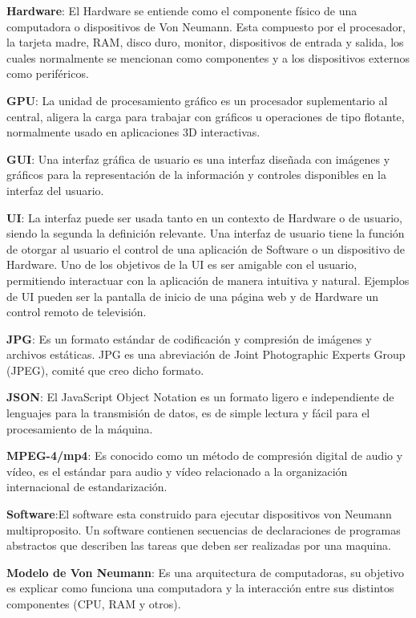 \textbf{Hardware}: El Hardware se entiende como el componente físico de una computadora o dispositivos de Von Neumann. Esta compuesto por el procesador, la tarjeta madre, RAM, disco duro, monitor, dispositivos de entrada y salida, los cuales normalmente se mencionan como componentes y a los dispositivos externos como periféricos\cite{hardwaredef}.

\textbf{GPU}: La unidad de procesamiento gráfico es un procesador suplementario al central, aligera la carga para trabajar con gráficos u operaciones de tipo flotante, normalmente usado en aplicaciones 3D interactivas. 

\textbf{GUI}: Una interfaz gráfica de usuario es una interfaz diseñada con imágenes y gráficos para la representación de la información y controles disponibles en la interfaz del usuario.

\textbf{UI}: La interfaz puede ser usada tanto en un contexto de Hardware o de usuario, siendo la segunda la definición relevante.
Una interfaz de usuario tiene la función de otorgar al usuario el control de una aplicación de Software o un dispositivo de Hardware. Uno de los objetivos de la UI es ser amigable con el usuario, permitiendo interactuar con la aplicación de manera intuitiva y natural. Ejemplos de UI pueden ser la pantalla de inicio de una página web y de Hardware un control remoto de televisión.

\textbf{JPG}: Es un formato estándar de codificación y compresión de imágenes y archivos estáticas. JPG es una abreviación de Joint Photographic Experts Group (JPEG), comité que creo dicho formato.

\textbf{JSON}: El JavaScript Object Notation es un formato ligero e independiente de lenguajes para la transmisión de datos, es de simple lectura y fácil para el procesamiento de la máquina.

\textbf{MPEG-4/mp4}: Es conocido como un método de compresión digital de audio y vídeo, es el estándar para audio y vídeo relacionado a la organización internacional de estandarización.

\textbf{Software}:El software esta construido para ejecutar dispositivos von Neumann multiproposito. Un software contienen secuencias de declaraciones de programas abstractos que describen las tareas que deben ser realizadas por una maquina. 

\textbf{Modelo de Von Neumann}: Es una arquitectura de computadoras, su objetivo es explicar como funciona una computadora y la interacción entre sus distintos componentes (CPU, RAM y otros).

